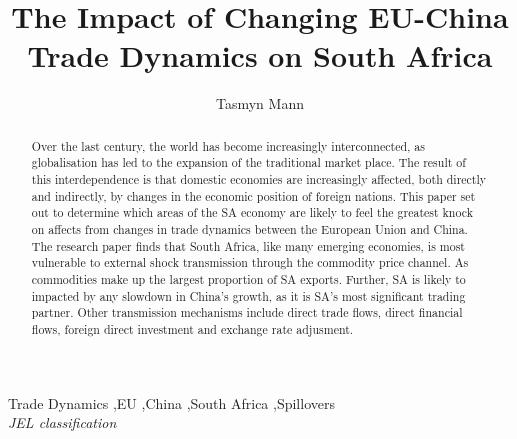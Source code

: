 \documentclass[11pt,preprint, authoryear]{elsarticle}
\numberwithin{equation}{section}
\numberwithin{figure}{section}
\numberwithin{table}{section}
\begin{document}
\begin{frontmatter}  %

\title{The Impact of Changing EU-China Trade Dynamics on South Africa}





\author[Add1]{Tasmyn Mann}





\address[Add1]{Stellenbosch University, Stellenbosch, South Africa}


\begin{abstract}
\small{
Over the last century, the world has become increasingly interconnected,
as globalisation has led to the expansion of the traditional market
place. The result of this interdependence is that domestic economies are
increasingly affected, both directly and indirectly, by changes in the
economic position of foreign nations. This paper set out to determine
which areas of the SA economy are likely to feel the greatest knock on
affects from changes in trade dynamics between the European Union and
China. The research paper finds that South Africa, like many emerging
economies, is most vulnerable to external shock transmission through the
commodity price channel. As commodities make up the largest proportion
of SA exports. Further, SA is likely to impacted by any slowdown in
China's growth, as it is SA's most significant trading partner. Other
transmission mechanisms include direct trade flows, direct financial
flows, foreign direct investment and exchange rate adjusment.
}
\end{abstract}

\vspace{1cm}

\begin{keyword}
\footnotesize{
Trade Dynamics \sep EU \sep China \sep South Africa \sep Spillovers \\ \vspace{0.3cm}
\textit{JEL classification} 
}
\end{keyword}
\vspace{0.5cm}
\end{frontmatter}



\pagestyle{fancy}
\chead{}
\rhead{}
\lfoot{}
\lhead{}
\cfoot{}
\end{document}
